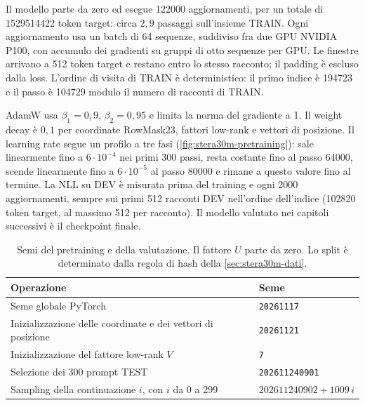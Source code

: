 Il modello parte da zero ed esegue \num{122000} aggiornamenti, per un totale di \num{1529514422} token target: circa $2{,}9$ passaggi sull'insieme TRAIN. Ogni aggiornamento usa un batch di 64 sequenze, suddiviso fra due GPU NVIDIA P100, con accumulo dei gradienti su gruppi di otto sequenze per GPU. Le finestre arrivano a 512 token target e restano entro lo stesso racconto; il padding è escluso dalla loss. L'ordine di visita di TRAIN è deterministico: il primo indice è \num{194723} e il passo è \num{104729} modulo il numero di racconti di TRAIN.

AdamW usa $\beta_1=0{,}9$, $\beta_2=0{,}95$ e limita la norma del gradiente a 1. Il weight decay è $0{,}1$ per coordinate RowMask23, fattori low-rank e vettori di posizione. Il learning rate segue un profilo a tre fasi (\autoref{fig:stera30m-pretraining}): sale linearmente fino a $6\cdot10^{-4}$ nei primi 300 passi, resta costante fino al passo \num{64000}, scende linearmente fino a $6\cdot10^{-5}$ al passo \num{80000} e rimane a questo valore fino al termine. La NLL su DEV è misurata prima del training e ogni \num{2000} aggiornamenti, sempre sui primi 512 racconti DEV nell'ordine dell'indice (\num{102820} token target, al massimo 512 per racconto). Il modello valutato nei capitoli successivi è il checkpoint finale.

\begin{table}[htbp]
\centering
\small
\begin{tabularx}{\linewidth}{Xl}
\toprule
Operazione & Seme \\
\midrule
Seme globale PyTorch & \texttt{20261117} \\
Inizializzazione delle coordinate e dei vettori di posizione & \texttt{20261121} \\
Inizializzazione del fattore low-rank $V$ & \texttt{7} \\
Selezione dei 300 prompt TEST & \texttt{202611240901} \\
Sampling della continuazione $i$, con $i$ da 0 a 299 & $202611240902+1009\,i$ \\
\bottomrule
\end{tabularx}
\caption{Semi del pretraining e della valutazione. Il fattore $U$ parte da zero. Lo split è determinato dalla regola di hash della \autoref{sec:stera30m-dati}.}
\label{tab:stera30m-seed}
\end{table}
